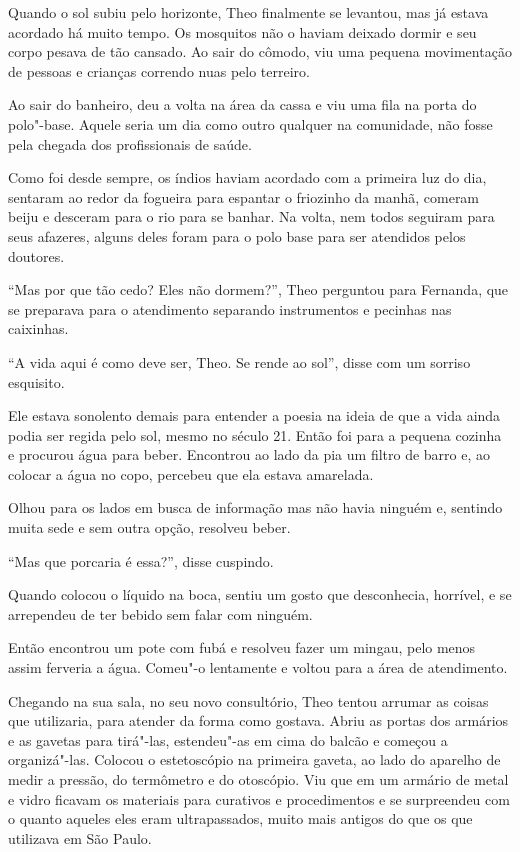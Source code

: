 Quando o sol subiu pelo horizonte, Theo finalmente se levantou, mas já
estava acordado há muito tempo. Os mosquitos não o haviam deixado dormir
e seu corpo pesava de tão cansado. Ao sair do cômodo, viu uma pequena
movimentação de pessoas e crianças correndo nuas pelo terreiro.

Ao sair do banheiro, deu a volta na área da cassa e viu uma fila na
porta do polo"-base. Aquele seria um dia como outro qualquer na
comunidade, não fosse pela chegada dos profissionais de saúde.

Como foi desde sempre, os índios haviam acordado com a primeira luz do
dia, sentaram ao redor da fogueira para espantar o friozinho da manhã,
comeram beiju e desceram para o rio para se banhar. Na volta, nem todos
seguiram para seus afazeres, alguns deles foram para o polo base para
ser atendidos pelos doutores.

``Mas por que tão cedo? Eles não dormem?'', Theo perguntou para
Fernanda, que se preparava para o atendimento separando instrumentos e
pecinhas nas caixinhas.

``A vida aqui é como deve ser, Theo. Se rende ao sol'', disse com um
sorriso esquisito.

Ele estava sonolento demais para entender a poesia na ideia de que a
vida ainda podia ser regida pelo sol, mesmo no século 21. Então foi para
a pequena cozinha e procurou água para beber. Encontrou ao lado da pia
um filtro de barro e, ao colocar a água no copo, percebeu que ela estava
amarelada.

Olhou para os lados em busca de informação mas não havia ninguém e,
sentindo muita sede e sem outra opção, resolveu beber.

``Mas que porcaria é essa?'', disse cuspindo.

Quando colocou o líquido na boca, sentiu um gosto que desconhecia,
horrível, e se arrependeu de ter bebido sem falar com ninguém.

Então encontrou um pote com fubá e resolveu fazer um mingau, pelo menos
assim ferveria a água. Comeu"-o lentamente e voltou para a área de
atendimento.

Chegando na sua sala, no seu novo consultório, Theo tentou arrumar as
coisas que utilizaria, para atender da forma como gostava. Abriu as
portas dos armários e as gavetas para tirá"-las, estendeu"-as em cima do
balcão e começou a organizá"-las. Colocou o estetoscópio na primeira
gaveta, ao lado do aparelho de medir a pressão, do termômetro e do
otoscópio. Viu que em um armário de metal e vidro ficavam os materiais
para curativos e procedimentos e se surpreendeu com o quanto aqueles
eles eram ultrapassados, muito mais antigos do que os que utilizava em
São Paulo.

